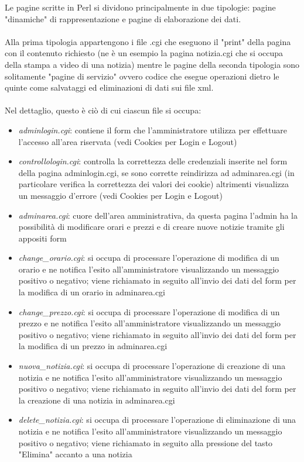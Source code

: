 \documentclass[12pt]{article}
\begin{document}
				  Le pagine scritte in Perl si dividono principalmente in due tipologie: pagine "dinamiche" di rappresentazione e pagine di elaborazione dei dati.\\ \\
				Alla prima tipologia appartengono i file .cgi che eseguono il "print" della pagina con il contenuto richiesto (ne \`e un esempio la pagina notizia.cgi che si occupa della stampa a video di una notizia) mentre le pagine della seconda tipologia sono solitamente "pagine di servizio" ovvero codice che esegue operazioni dietro le quinte come salvataggi ed eliminazioni di dati sui file xml. \\ \\Nel dettaglio, questo \`e ci\`o di cui ciascun file si occupa:
\begin{itemize}
\item \textit{adminlogin.cgi}: contiene il form che l'amministratore utilizza per effettuare l'accesso all'area riservata (vedi Cookies per Login e Logout)
\item \textit{controllologin.cgi}: controlla la correttezza delle credenziali inserite nel form della pagina adminlogin.cgi, se sono corrette reindirizza ad adminarea.cgi (in particolare verifica la correttezza dei valori dei cookie) altrimenti visualizza un messaggio d'errore (vedi Cookies per Login e Logout)
\item \textit{adminarea.cgi}: cuore dell'area amministrativa, da questa pagina l'admin ha la possibilità di modificare orari e prezzi e di creare nuove notizie tramite gli appositi form
\item \textit{change\_orario.cgi}: si occupa di processare l'operazione di modifica di un orario e ne notifica l'esito all'amministratore visualizzando un messaggio positivo o negativo; viene richiamato in seguito all'invio dei dati del form per la modifica di un orario in adminarea.cgi
\item \textit{change\_prezzo.cgi}: si occupa di processare l'operazione di modifica di un prezzo e ne notifica l'esito all'amministratore visualizzando un messaggio positivo o negativo; viene richiamato in seguito all'invio dei dati del form per la modifica di un prezzo in adminarea.cgi
\item \textit{nuova\_notizia.cgi}: si occupa di processare l'operazione di creazione di una notizia e ne notifica l'esito all'amministratore visualizzando un messaggio positivo o negativo; viene richiamato in seguito all'invio dei dati del form per la creazione di una notizia in adminarea.cgi
\item \textit{delete\_notizia.cgi}: si occupa di processare l'operazione di eliminazione di una notizia e ne notifica l'esito all'amministratore visualizzando un messaggio positivo o negativo; viene richiamato in seguito alla pressione del tasto "Elimina" accanto a una notizia

\end{itemize}
\end{document}
